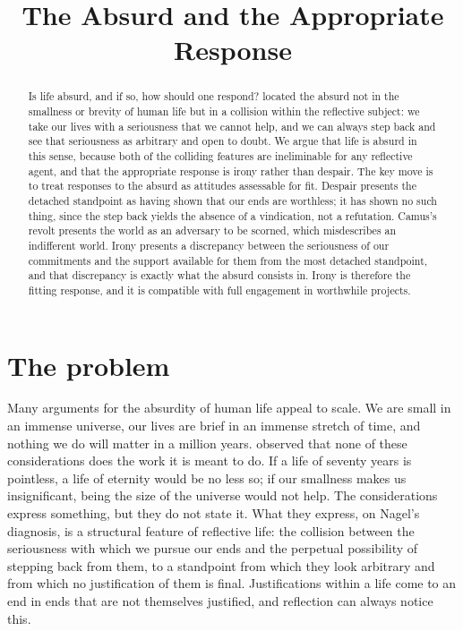 \documentclass{situationist-preprint}
\title{The Absurd and the Appropriate Response}
\begin{document}
\maketitle

\begin{abstract}
Is life absurd, and if so, how should one respond? \citet{Nagel1971} located the absurd not in the smallness or brevity of human life but in a collision within the reflective subject: we take our lives with a seriousness that we cannot help, and we can always step back and see that seriousness as arbitrary and open to doubt. We argue that life is absurd in this sense, because both of the colliding features are ineliminable for any reflective agent, and that the appropriate response is irony rather than despair. The key move is to treat responses to the absurd as attitudes assessable for fit. Despair presents the detached standpoint as having shown that our ends are worthless; it has shown no such thing, since the step back yields the absence of a vindication, not a refutation. Camus's revolt presents the world as an adversary to be scorned, which misdescribes an indifferent world. Irony presents a discrepancy between the seriousness of our commitments and the support available for them from the most detached standpoint, and that discrepancy is exactly what the absurd consists in. Irony is therefore the fitting response, and it is compatible with full engagement in worthwhile projects.
\end{abstract}

\section{The problem}

Many arguments for the absurdity of human life appeal to scale. We are small in an immense universe, our lives are brief in an immense stretch of time, and nothing we do will matter in a million years. \citet{Nagel1971} observed that none of these considerations does the work it is meant to do. If a life of seventy years is pointless, a life of eternity would be no less so; if our smallness makes us insignificant, being the size of the universe would not help. The considerations express something, but they do not state it. What they express, on Nagel's diagnosis, is a structural feature of reflective life: the collision between the seriousness with which we pursue our ends and the perpetual possibility of stepping back from them, to a standpoint from which they look arbitrary and from which no justification of them is final. Justifications within a life come to an end in ends that are not themselves justified, and reflection can always notice this.
\end{document}
